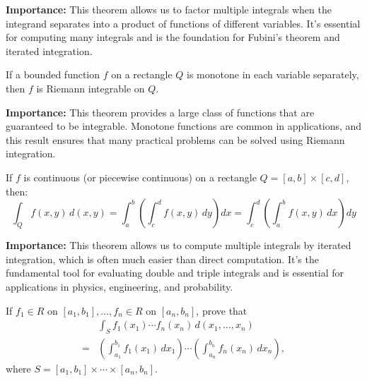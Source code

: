\noindent\textbf{Importance:} This theorem allows us to factor multiple integrals when the integrand separates into a product of functions of different variables. It's essential for computing many integrals and is the foundation for Fubini's theorem and iterated integration.



\begin{theorem}
If a bounded function $f$ on a rectangle $Q$ is monotone in each variable separately, then $f$ is Riemann integrable on $Q$.
\end{theorem}

\noindent\textbf{Importance:} This theorem provides a large class of functions that are guaranteed to be integrable. Monotone functions are common in applications, and this result ensures that many practical problems can be solved using Riemann integration.



\begin{theorem}
If $f$ is continuous (or piecewise continuous) on a rectangle $Q = [a, b] \times [c, d]$, then:
\[\int_Q f(x, y) \, d(x, y) = \int_a^b \left(\int_c^d f(x, y) \, dy\right) dx = \int_c^d \left(\int_a^b f(x, y) \, dx\right) dy\]
\end{theorem}

\noindent\textbf{Importance:} This theorem allows us to compute multiple integrals by iterated integration, which is often much easier than direct computation. It's the fundamental tool for evaluating double and triple integrals and is essential for applications in physics, engineering, and probability.





\begin{problembox}
\begin{problemstatement}
If \( f_1 \in R \) on \([a_1, b_1], \ldots, f_n \in R \) on \([a_n, b_n]\), prove that
\begin{align*}
 &\int_{S} f_1(x_1) \cdots f_n(x_n) \, d(x_1, \ldots, x_n) \\
 =& \left( \int_{a_1}^{b_1} f_1(x_1) \, dx_1 \right) \cdots \left( \int_{a_n}^{b_n} f_n(x_n) \, dx_n \right), 
\end{align*}
 where \( S = [a_1, b_1] \times \cdots \times [a_n, b_n] \).
\end{problemstatement}
\end{problembox}

